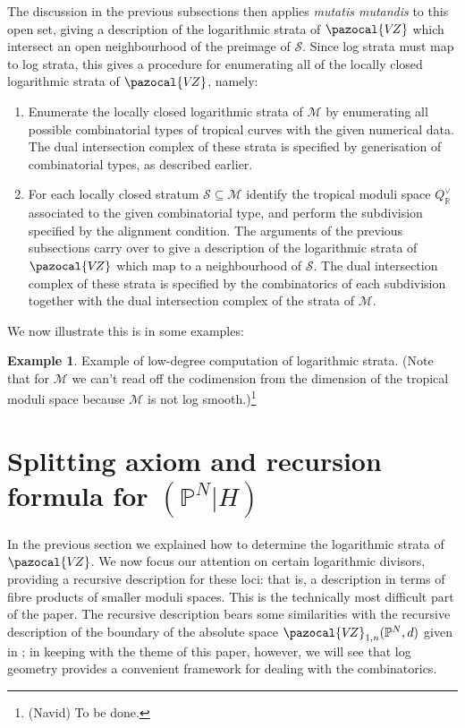 \documentclass[11pt]{amsart}
\newcommand{\PP}{\mathbb P}
\newcommand{\VZ}{\pazocal{V\!Z}}
\newcommand{\Scal}{\mathcal{S}}
\newcommand{\Mcal}{\mathcal{M}}
\newcommand{\RR}{\mathbb{R}}
\theoremstyle{definition}
\theoremstyle{definition}
\newtheorem{example}[thm]{Example}
\begin{document}
The discussion in the previous subsections then applies \emph{mutatis mutandis} to this open set, giving a description of the logarithmic strata of $\VZ$ which intersect an open neighbourhood of the preimage of $\Scal$. Since log strata must map to log strata, this gives a procedure for enumerating all of the locally closed logarithmic strata of $\VZ$, namely:\medskip
\begin{enumerate}
\item Enumerate the locally closed logarithmic strata of $\Mcal$ by enumerating all possible combinatorial types of tropical curves with the given numerical data. The dual intersection complex of these strata is specified by generisation of combinatorial types, as described earlier.\medskip
\item For each locally closed stratum $\Scal\subseteq \Mcal$ identify the tropical moduli space $Q^\vee_{\RR}$ associated to the given combinatorial type, and perform the subdivision specified by the alignment condition. The arguments of the previous subsections carry over to give a description of the logarithmic strata of $\VZ$ which map to a neighbourhood of $\Scal$. The dual intersection complex of these strata is specified by the combinatorics of each subdivision together with the dual intersection complex of the strata of $\Mcal$.
\end{enumerate}
We now illustrate this is in some examples:
\begin{example} Example of low-degree computation of logarithmic strata. (Note that for $\Mcal$ we can't read off the codimension from the dimension of the tropical moduli space because $\Mcal$ is not log smooth.)\footnote{(Navid) To be done.}\end{example}


\newpage

\section{Splitting axiom and recursion formula for $(\PP^N|H)$}

\noindent  In the previous section we explained how to determine the logarithmic strata of $\VZ$. We now focus our attention on certain logarithmic divisors, providing a recursive description for these loci: that is, a description in terms of fibre products of smaller moduli spaces. This is the technically most difficult part of the paper. The recursive description bears some similarities with the recursive description of the boundary of the absolute space $\VZ_{1,n}(\PP^N,d)$ given in \cite{VZ}; in keeping with the theme of this paper, however, we will see that log geometry provides a convenient framework for dealing with the combinatorics.
\end{document}
